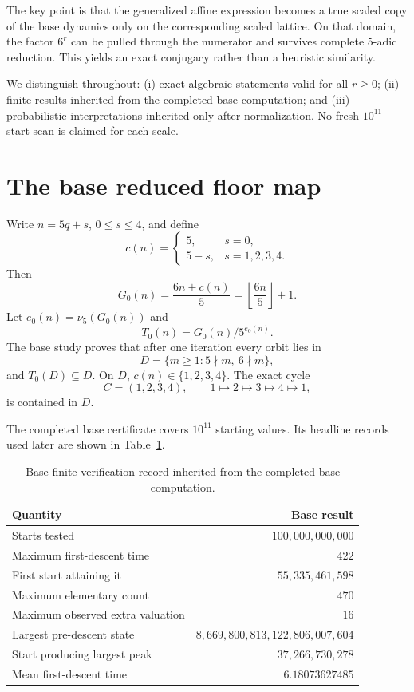 \documentclass[11pt]{article}
\theoremstyle{remark}\newtheorem{remark}[theorem]{Remark}\newtheorem{example}[theorem]{Example}
\newcommand{\vfive}{\nu_5}
\begin{document}
The key point is that the generalized affine expression becomes a true scaled copy of the base dynamics only on the corresponding scaled lattice. On that domain, the factor $6^r$ can be pulled through the numerator and survives complete $5$-adic reduction. This yields an exact conjugacy rather than a heuristic similarity.

We distinguish throughout: (i) exact algebraic statements valid for all $r\ge0$; (ii) finite results inherited from the completed base computation; and (iii) probabilistic interpretations inherited only after normalization. No fresh $10^{11}$-start scan is claimed for each scale.

\section{The base reduced floor map}
Write $n=5q+s$, $0\le s\le4$, and define
\[
c(n)=\begin{cases}5,&s=0,\\5-s,&s=1,2,3,4.\end{cases}
\]
Then
\begin{equation}\label{eq:base-affine}
G_0(n)=\frac{6n+c(n)}5=\left\lfloor\frac{6n}{5}\right\rfloor+1.
\end{equation}
Let $e_0(n)=\vfive(G_0(n))$ and
\[
T_0(n)=G_0(n)/5^{e_0(n)}.
\]
The base study proves that after one iteration every orbit lies in
\[
D=\{m\ge1:5\nmid m,\ 6\nmid m\},
\]
and $T_0(D)\subseteq D$. On $D$, $c(n)\in\{1,2,3,4\}$. The exact cycle
\[
C=(1,2,3,4),\qquad1\mapsto2\mapsto3\mapsto4\mapsto1,
\]
is contained in $D$.

The completed base certificate covers $10^{11}$ starting values. Its headline records used later are shown in Table~\ref{tab:base}.
\begin{table}[ht]\centering
\caption{Base finite-verification record inherited from the completed base computation.}\label{tab:base}
\begin{tabular}{lr}\toprule
Quantity & Base result\\\midrule
Starts tested & $100,000,000,000$\\
Maximum first-descent time & $422$\\
First start attaining it & $55,335,461,598$\\
Maximum elementary count & $470$\\
Maximum observed extra valuation & $16$\\
Largest pre-descent state & $8,669,800,813,122,806,007,604$\\
Start producing largest peak & $37,266,730,278$\\
Mean first-descent time & $6.18073627485$\\\bottomrule
\end{tabular}
\end{table}
\end{document}
